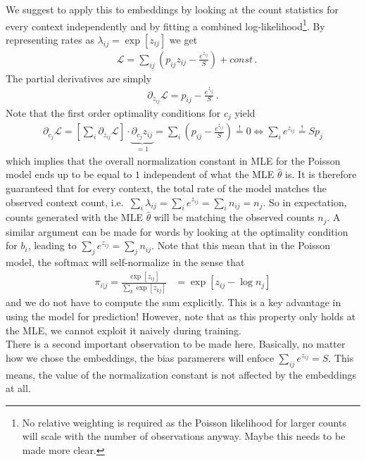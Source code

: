 \documentclass{article}
\newcommand{\logl}{{\mathcal L}}
\begin{document}
We suggest to apply this to embeddings by looking at the count statistics for every context independently and by fitting a combined log-likelihood\footnote{No relative weighting is required as the Poisson likelihood for larger counts will scale with the number of observations anyway. Maybe this needs to be made more clear.}. By representing rates as $\lambda_{ij} = \exp[z_{ij}]$ we get 
\begin{align}
\label{eq:poissonlogl}
& \logl  = \sum_{ij} \left( p_{ij} z_{ij}  - \frac{e^{z_{ij}}}{S} \right) + const\,.
\end{align}
The partial derivatives are simply 
\begin{align}
\partial_{z_{ij}} \logl = p_{ij} - \frac{e^{z_{ij}}}S \,.
\label{poisson:dz}
\end{align}
Note that the first order optimality conditions for $c_j$ yield
\begin{align}
\partial_{c_j} \logl =  \left[ \sum_i \partial_{z_{ij}} \logl \right] \cdot \underbrace{\partial_{c_j} z_{ij}}_{=1} = \sum_{i} \left( p_{ij} - \frac {e^{z_{ij}}}S \right) \stackrel !=0  \iff
\sum_{i} e^{z_{ij}} \stackrel != S p_j 
\label{eq:possion-constraints}
\end{align}
which implies that the overall normalization constant in MLE for the Poisson model ends up to be equal to $1$ independent of what the MLE $\hat\theta$ is. It is therefore guaranteed that for every context, the total rate of the model matches the observed context count, i.e.~$\sum_i \lambda_{ij} = \sum_i e^{z_{ij}} = \sum_i n_{ij}=n_j$. So in expectation, counts generated with the MLE $\hat \theta$  will be matching the observed counts $n_j$. A similar argument can be made for words by looking at the optimality condition for $b_i$, leading to $\sum_{j} e^{z_{ij}} = \sum_{j} n_{ij}$. Note that this mean that in the Poisson model, the softmax will self-normalize in the sense that 
\begin{align}
\pi_{i|j} =\frac{\exp[z_{ij}]}{\sum_k \exp[z_{kj}]} & = \exp[z_{ij} - \log n_j] 
\end{align}
and we do not have to compute the sum explicitly. This is a key advantage in using the model for prediction! However, note that as this property only holds at the MLE, we cannot exploit it naively during training. \\

There is a second important observation to be made here. Basically, no matter how we chose the embeddings, the bias paramerers will enfoce $\sum_{ij} e^{z_{ij}} =S$. This means, the value of the normalization constant is not affected by the embeddings at all. 
\newpage
\end{document}
